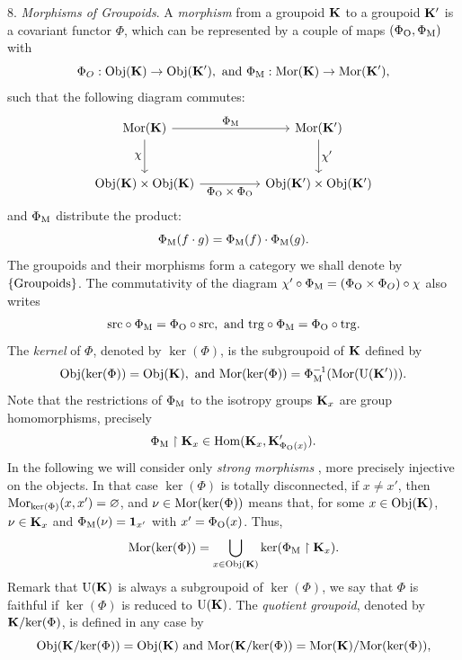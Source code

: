 \begin{article}
  8. {\em Morphisms of Groupoids}.
  A {\em morphism} from a groupoid ${\mathbf K}$ to a groupoid ${\mathbf K}'$ is a covariant functor $\Phi$,
  which can be represented by a couple of maps $(\Phi_{\mathrm{O}}, \Phi_{\mathrm{M}})$ with
  $$%
  \Phi_\O : \Obj(\KK) \to \Obj(\KK'), \text{ and } \Phi_\eM : \Mor(\KK) \to \Mor(\KK'),
  $$%
  such that the following diagram commutes:
  \begin{equation}\renewcommand{\theequation}{$\diamondsuit$}
    \begin{tikzcd}[column sep=huge, row sep=large, every label/.append style = {font = \small}]
      \Mor(\KK) \arrow[d, swap, "\car"] \arrow[r,"\Phi_\eM"] & \Mor(\KK') \arrow[d, "\car'"]  \\
      \Obj(\KK) \times \Obj(\KK) \arrow[r, swap, "\Phi_\eO \times \Phi_\eO"] & \Obj(\KK') \times \Obj(\KK')
    \end{tikzcd}
  \end{equation}
  and $\Phi_{\mathrm{M}}$ distribute the product:
  $$%
  \Phi_\eM(f \cdot g) =
  \Phi_\eM(f) \cdot \Phi_\eM(g).
  $$%
  The groupoids and their morphisms form a category we shall denote by $\{\operatorname{Groupoids}\}$.
  The commutativity of the diagram $\chi' \circ \Phi_{\mathrm{M}} = (\Phi_{\mathrm{O}} \times \Phi_O) \circ \chi$ also writes
  $$%
  \source \circ \Phi_\eM = \Phi_\eO \circ \source, \text{ and } \target \circ \Phi_\eM = \Phi_\eO \circ \target.
  $$%
  The {\em kernel} of $\Phi$,
  denoted by $\ker(\Phi)$,
  is the subgroupoid of ${\mathbf K}$ defined by
  $$%
  \Obj(\ker(\Phi)) = \Obj(\KK), \text{ and } \Mor(\ker(\Phi)) = \Phi_\eM^{-1}(\Mor(\Units{\KK'})).
  $$%
  Note that the restrictions of $\Phi_{\mathrm{M}}$ to the isotropy groups ${\mathbf K}_x$ are group homomorphisms,
  precisely
  $$%
  \Phi_\eM \restriction \KK_x \in \Hom(\KK_x, \KK'_{\Phi_\eO(x)}).
  $$%
  In the following we will consider only {\em strong morphisms} \cite{Iva99},
  more precisely injective on the objects.
  In that case $\ker(\Phi)$ is totally disconnected,
  if  $x \neq x'$,
  then ${\operatorname{Mor}}_{\mathrm{ker}(\Phi)}(x,x') = \varnothing$,
  and $\nu \in {\operatorname{Mor}}(\mathrm{ker}(\Phi))$ means that,
  for some $x \in {\operatorname{Obj}}({\mathbf K})$,
  $\nu \in {\mathbf K}_x$ and $\Phi_{\mathrm{M}}(\nu) = {\bf 1}_{x'}$ with $x' =  \Phi_{\mathrm{O}}(x)$.
  Thus,
  $$%
  \Mor(\ker(\Phi)) = \bigcup_{x \in \Obj(\KK)} \ker(\Phi_\eM \restriction \KK_x).
  $$%
  Remark that ${\operatorname{U}({\mathbf K})}$ is always a subgroupoid of $\ker(\Phi)$,
  we say that $\Phi$ is faithful if $\ker(\Phi)$ is reduced to ${\operatorname{U}({\mathbf K})}$.
  The {\em quotient groupoid}, denoted by ${\mathbf K}/\mathrm{ker}(\Phi)$,
  is defined in any case by
  $$%
  \Obj(\KK/\ker(\Phi)) = \Obj(\KK)
  \ \text{and} \
  \Mor(\KK/\ker(\Phi)) = \Mor(\KK) / \Mor(\ker(\Phi)),
$$
\end{article}
